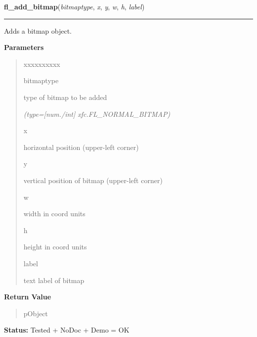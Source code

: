     \label{xformslib:library:fl_add_bitmap}

    \vspace{0.5ex}

\hspace{.8\funcindent}\begin{boxedminipage}{\funcwidth}

    \raggedright \textbf{fl\_add\_bitmap}(\textit{bitmaptype}, \textit{x}, \textit{y}, \textit{w}, \textit{h}, \textit{label})

    \vspace{-1.5ex}

    \rule{\textwidth}{0.5\fboxrule}
\setlength{\parskip}{2ex}
    Adds a bitmap object.

\setlength{\parskip}{1ex}
      \textbf{Parameters}
      \vspace{-1ex}

      \begin{quote}
        \begin{Ventry}{xxxxxxxxxx}

          \item[bitmaptype]

          type of bitmap to be added

            {\it (type=[num./int] xfc.FL\_NORMAL\_BITMAP)}

          \item[x]

          horizontal position (upper-left corner)

          \item[y]

          vertical position of bitmap (upper-left corner)

          \item[w]

          width in coord units

          \item[h]

          height in coord units

          \item[label]

          text label of bitmap

        \end{Ventry}

      \end{quote}

      \textbf{Return Value}
    \vspace{-1ex}

      \begin{quote}
      pObject

      \end{quote}

\textbf{Status:} Tested + NoDoc + Demo = OK



    \end{boxedminipage}

